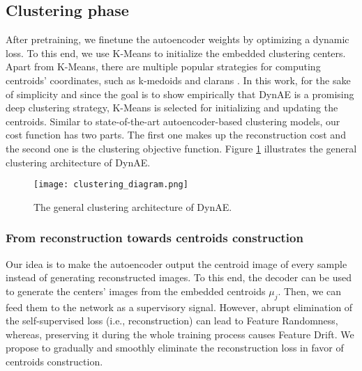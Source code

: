 \documentclass{article}
\begin{document}
\subsection{Clustering phase}
After pretraining, we finetune the autoencoder weights by optimizing a dynamic loss. To this end, we use K-Means to initialize the embedded clustering centers. Apart from K-Means, there are multiple popular strategies for computing centroids' coordinates, such as k-medoids \cite{paper95} and clarans \cite{paper96}. In this work, for the sake of simplicity and since the goal is to show empirically that DynAE is a promising deep clustering strategy, K-Means is selected for initializing and updating the centroids. 
Similar to state-of-the-art autoencoder-based clustering models, our cost function has two parts. The first one makes up the reconstruction cost and the second one is the clustering objective function. Figure \ref{fig:clustering_diagram} illustrates the general clustering architecture of DynAE.
 
\begin{figure}[ht]
\vskip 0.2in
\begin{center}
\centerline{\texttt{[image: clustering\_diagram.png]}}
\caption{The general clustering architecture of DynAE.}
\label{fig:clustering_diagram}
\end{center}
\vskip -0.2in
\end{figure}

\subsubsection{From reconstruction towards centroids construction}

Our idea is to make the autoencoder output the centroid image of every sample instead of generating reconstructed images. To this end, the decoder can be used to generate the centers' images from the embedded centroids $\mu_{j}$. Then, we can feed them to the network as a supervisory signal. However, abrupt elimination of the self-supervised loss (i.e., reconstruction) can lead to Feature Randomness, whereas, preserving it during the whole training process causes Feature Drift. We propose to gradually and smoothly eliminate the reconstruction loss in favor of centroids construction. 
\end{document}
